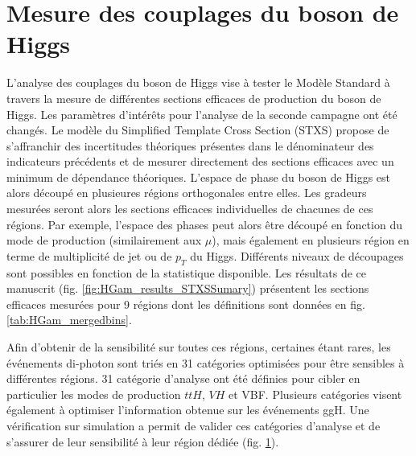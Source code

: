 \section{Mesure des couplages du boson de Higgs}

L'analyse des couplages du boson de Higgs vise à tester le Modèle Standard à travers la mesure de différentes sections efficaces de production du boson de Higgs.
Les paramètres d'intérêts pour l'analyse de la seconde campagne ont été changés.
Le modèle du  Simplified Template Cross Section (STXS) propose de s'affranchir des incertitudes théoriques présentes dans le dénominateur des indicateurs précédents et de mesurer directement des sections efficaces avec un minimum de dépendance théoriques.
L'espace de phase du boson de Higgs est alors découpé en plusieures régions orthogonales entre elles.
Les gradeurs mesurées seront alors les sections efficaces individuelles de chacunes de ces régions.
Par exemple, l'espace des phases peut alors être découpé en fonction du mode de production (similairement aux $\mu$), mais également en plusieurs région en terme de multiplicité de jet ou de $p_T$ du Higgs.
Différents niveaux de découpages sont possibles en fonction de la statistique disponible.
Les résultats de ce manuscrit (fig. \ref{fig:HGam_results_STXSSumary}) présentent les sections efficaces mesurées pour 9 régions dont les définitions sont données en fig. \ref{tab:HGam_mergedbins}.

Afin d'obtenir de la sensibilité sur toutes ces régions, certaines étant rares, les événements di-photon sont triés en 31 catégories optimisées pour être sensibles à différentes régions.
31 catégorie d'analyse ont été définies pour cibler en particulier les modes de production $ttH$, $VH$ et VBF.
Plusieurs catégories visent également à optimiser l'information obtenue sur les événements ggH.
Une vérification sur simulation a permit de valider ces catégories d'analyse et de s'assurer de leur sensibilité à leur région dédiée (fig. \ref{}).

